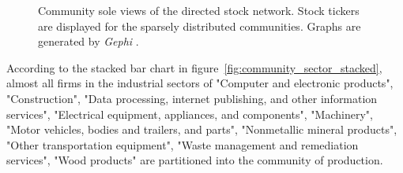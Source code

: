 \begin{figure}
{		\label{fig:community_3}%
	}%
	\hfill%
	\hfill%
	\caption{Community sole views of the directed stock network. Stock tickers are displayed for the sparsely distributed communities. Graphs are generated by \textit{Gephi} \cite{ICWSM09154}.} \label{fig:distinctcommunities}
\end{figure}

According to the stacked bar chart in figure~\ref{fig:community_sector_stacked}, almost all firms in the industrial sectors of "Computer and electronic products", "Construction", "Data processing, internet publishing, and other information services", "Electrical equipment, appliances, and components", "Machinery", "Motor vehicles, bodies and trailers, and parts", "Nonmetallic mineral products", "Other transportation equipment", "Waste management and remediation services", "Wood products" are partitioned into the community of production.

